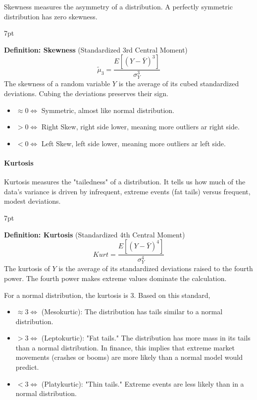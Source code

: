 \documentclass{article}
\newenvironment{greenblock}{%
\def\FrameCommand{%
  \hspace{1pt}%
    {\color{Green}%
    \vrule width 2pt}%
    {\color{greenshade}%
    \vrule width 4pt}%
  \colorbox{greenshade}%
}%
\MakeFramed{%
  \advance%
  \hsize-%
  \width%
  \FrameRestore}%
\noindent\hspace{-4.55pt}%
\begin{adjustwidth}{}{7pt}%
\vspace{2pt}\vspace{2pt}%
}
{%
\vspace{2pt}\end{adjustwidth}\endMakeFramed%
}
\begin{document}
Skewness measures the asymmetry of a distribution. A perfectly symmetric distribution has zero skewness.

\begin{greenblock}
\textbf{Definition: Skewness} (Standardized 3rd Central Moment)
\begin{equation}
\tilde \mu_3=\frac{E[(Y-\bar Y)^3]}{\sigma^3_Y}
\end{equation}
The skewness of a random variable $Y$ is the average of its cubed standardized deviations. Cubing the deviations preserves their sign.
\end{greenblock}


\begin{itemize}
  \item $\approx 0 \iff $ Symmetric, almost like normal distribution.

  \item $>0 \iff $ Right Skew, right side lower, meaning more outliers ar right side.
  
  \item $<0 \iff $ Left Skew, left side lower, meaning more outliers ar left side.
\end{itemize}
  

\paragraph{Kurtosis}  


Kurtosis measures the "tailedness" of a distribution. It tells us how much of the data's variance is driven by infrequent, extreme events (fat tails) versus frequent, modest deviations.
\begin{greenblock}
\textbf{Definition: Kurtosis} (Standardized 4th Central Moment)
\begin{equation}
Kurt=\frac{E[(Y-\bar Y)^4]}{\sigma^4_Y}
\end{equation}
The kurtosis of $Y$ is the average of its standardized deviations raised to the fourth power. The fourth power makes extreme values dominate the calculation.
\end{greenblock}

For a normal distribution, the kurtosis is 3. Based on this standard,
\begin{itemize}
  \item $\approx 3 \iff$ (Mesokurtic): The distribution has tails similar to a normal distribution.
  \item $>3 \iff$ (Leptokurtic): "Fat tails." The distribution has more mass in its tails than a normal distribution. In finance, this implies that extreme market movements (crashes or booms) are more likely than a normal model would predict.
  
  \item $<3 \iff$ (Platykurtic): "Thin tails." Extreme events are less likely than in a normal distribution.
\end{itemize}
\end{document}
